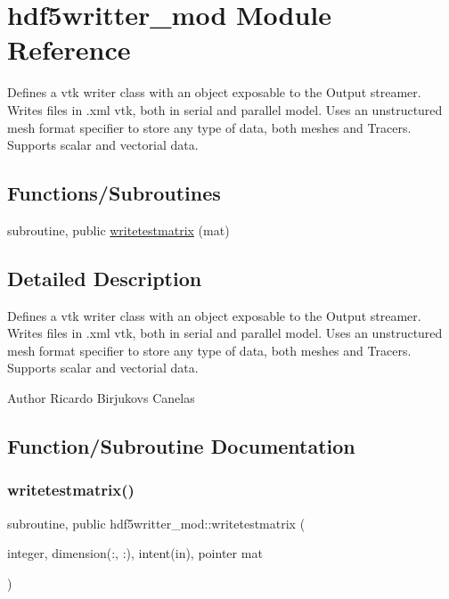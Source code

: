 \hypertarget{namespacehdf5writter__mod}{}\section{hdf5writter\+\_\+mod Module Reference}
\label{namespacehdf5writter__mod}


Defines a vtk writer class with an object exposable to the Output streamer. Writes files in .xml vtk, both in serial and parallel model. Uses an unstructured mesh format specifier to store any type of data, both meshes and Tracers. Supports scalar and vectorial data.  


\subsection*{Functions/\+Subroutines}
\begin{DoxyCompactItemize}
\item 
subroutine, public \mbox{\hyperlink{namespacehdf5writter__mod_a365615aa2f72e08015a020475c37a6c8}{writetestmatrix}} (mat)
\end{DoxyCompactItemize}


\subsection{Detailed Description}
Defines a vtk writer class with an object exposable to the Output streamer. Writes files in .xml vtk, both in serial and parallel model. Uses an unstructured mesh format specifier to store any type of data, both meshes and Tracers. Supports scalar and vectorial data. 

\begin{DoxyAuthor}{Author}
Ricardo Birjukovs Canelas 
\end{DoxyAuthor}


\subsection{Function/\+Subroutine Documentation}
\mbox{\label{namespacehdf5writter__mod_a365615aa2f72e08015a020475c37a6c8}} 
\subsubsection{\texorpdfstring{writetestmatrix()}{writetestmatrix()}}
{\footnotesize\ttfamily subroutine, public hdf5writter\+\_\+mod\+::writetestmatrix (\begin{DoxyParamCaption}\item[{integer, dimension(\+:, \+:), intent(in), pointer}]{mat }\end{DoxyParamCaption})}




